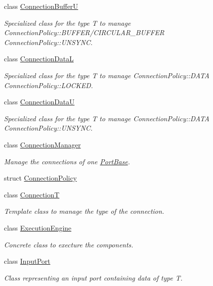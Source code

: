 \begin{DoxyCompactItemize}
class \hyperlink{classcoco_1_1_connection_buffer_u}{Connection\+Buffer\+U}
\begin{DoxyCompactList}\small\item\em Specialized class for the type T to manage Connection\+Policy\+::\+B\+U\+F\+F\+E\+R/\+C\+I\+R\+C\+U\+L\+A\+R\+\_\+\+B\+U\+F\+F\+E\+R Connection\+Policy\+::\+U\+N\+S\+Y\+N\+C. \end{DoxyCompactList}\item 
class \hyperlink{classcoco_1_1_connection_data_l}{Connection\+Data\+L}
\begin{DoxyCompactList}\small\item\em Specialized class for the type T to manage Connection\+Policy\+::\+D\+A\+T\+A Connection\+Policy\+::\+L\+O\+C\+K\+E\+D. \end{DoxyCompactList}\item 
class \hyperlink{classcoco_1_1_connection_data_u}{Connection\+Data\+U}
\begin{DoxyCompactList}\small\item\em Specialized class for the type T to manage Connection\+Policy\+::\+D\+A\+T\+A Connection\+Policy\+::\+U\+N\+S\+Y\+N\+C. \end{DoxyCompactList}\item 
class \hyperlink{classcoco_1_1_connection_manager}{Connection\+Manager}
\begin{DoxyCompactList}\small\item\em Manage the connections of one \hyperlink{classcoco_1_1_port_base}{Port\+Base}. \end{DoxyCompactList}\item 
struct \hyperlink{structcoco_1_1_connection_policy}{Connection\+Policy}
\item 
class \hyperlink{classcoco_1_1_connection_t}{Connection\+T}
\begin{DoxyCompactList}\small\item\em Template class to manage the type of the connection. \end{DoxyCompactList}\item 
class \hyperlink{classcoco_1_1_execution_engine}{Execution\+Engine}
\begin{DoxyCompactList}\small\item\em Concrete class to execture the components. \end{DoxyCompactList}\item 
class \hyperlink{classcoco_1_1_input_port}{Input\+Port}
\begin{DoxyCompactList}\small\item\em Class representing an input port containing data of type T. \end{DoxyCompactList}\item 

\end{DoxyCompactItemize}
